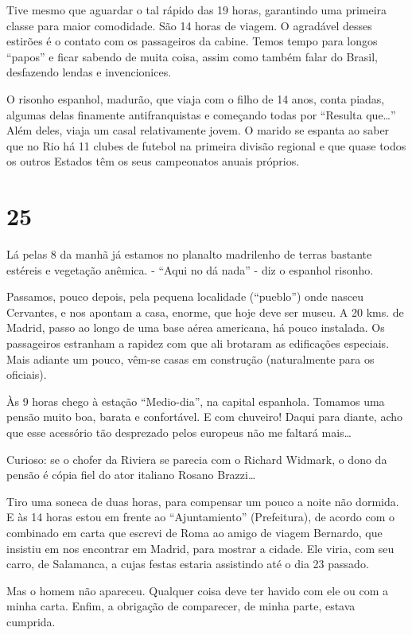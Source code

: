 Tive mesmo que aguardar o tal rápido das 19 horas, garantindo uma primeira classe para maior comodidade. São 14 horas de viagem. O agradável desses estirões é o contato com os passageiros da cabine. Temos tempo para longos “papos” e ficar sabendo de muita coisa, assim como também falar do Brasil, desfazendo lendas e invencionices.

O risonho espanhol, madurão, que viaja com o filho de 14 anos, conta piadas, algumas delas finamente antifranquistas e começando todas por “Resulta que\ldots” Além deles, viaja um casal relativamente jovem. O marido se espanta ao saber que no Rio há 11 clubes de futebol na primeira divisão regional e que quase todos os outros Estados têm os seus campeonatos anuais próprios.

\section*{25 \adfflatleafright {}}
Lá pelas 8 da manhã já estamos no planalto madrilenho de terras bastante estéreis e vegetação anêmica. - “Aqui no dá nada” - diz o espanhol risonho.

Passamos, pouco depois, pela pequena localidade (“pueblo”) onde nasceu Cervantes, e nos apontam a casa, enorme, que hoje deve ser museu. A 20 kms. de Madrid, passo ao longo de uma base aérea americana, há pouco instalada. Os passageiros estranham a rapidez com que ali brotaram as edificações especiais. Mais adiante um pouco, vêm-se casas em construção (naturalmente para os oficiais).

Às 9 horas chego à estação “Medio-dia”, na capital espanhola. Tomamos uma pensão muito boa, barata e confortável. E com chuveiro! Daqui para diante, acho que esse acessório tão desprezado pelos europeus não me faltará mais\ldots

Curioso: se o chofer da Riviera se parecia com o Richard Widmark, o dono da pensão é cópia fiel do ator italiano Rosano Brazzi\ldots

Tiro uma soneca de duas horas, para compensar um pouco a noite não dormida. E às 14 horas estou em frente ao “Ajuntamiento” (Prefeitura), de acordo com o combinado em carta que escrevi de Roma ao amigo de viagem Bernardo, que insistiu em nos encontrar em Madrid, para mostrar a cidade. Ele viria, com seu carro, de Salamanca, a cujas festas estaria assistindo até o dia 23 passado.

Mas o homem não apareceu. Qualquer coisa deve ter havido com ele ou com a minha carta. Enfim, a obrigação de comparecer, de minha parte, estava cumprida.


